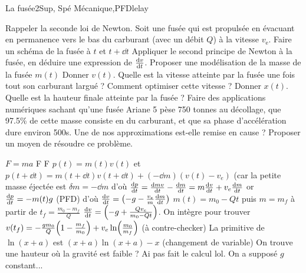 \begin{exercise}{La fusée}{2}{Sup, Spé}
{Mécanique,PFD}{lelay}

\begin{questions}
    \questioncours Rappeler la seconde loi de Newton.
    \question Soit une fusée qui est propulsée en évacuant en permanence vers le bas du carburant (avec un débit $Q$)  à la vitesse $v_\text{e}$. Faire un schéma de la fusée à $t$ et $t+\dd{t}$
    \question Appliquer le second principe de Newton à la fusée, en déduire une expression de $\dv{v}{t}$.
    \question Proposer une modélisation de la masse de la fusée $m(t)$
    \question Donner $v(t)$. Quelle est la vitesse atteinte par la fusée une fois tout son carburant largué ? Comment optimiser cette vitesse ?
    \question Donner $x(t)$. Quelle est la hauteur finale atteinte par la fusée ?
    \question Faire des applications numériques sachant qu'une fusée Ariane 5 pèse 750 tonnes au décollage, que 97.5\% de cette masse consiste en du carburant, et que sa phase d'accélération dure environ 500s.
    \question Une de nos approximations est-elle remise en cause ? Proposer un moyen de résoudre ce problème.
\end{questions}
\end{exercise}

\begin{solution}


\begin{questions}
    \questioncours $F=ma$
    \question F F 
    \question $p(t) = m(t) v(t)$ et $p(t+\dd{t}) = m(t+\dd{t})v(t+\dd{t}) + (-\dd{m})(v(t)-v_e)$ (car la petite masse éjectée est $\delta m = - \dd{m}$ d'où $\dv{p}{t} = \dv{mv}{t} - \dv{m}{t}(v-v_e) = m\dv{v}{t} + v_e\dv{m}{t}$ or $\dv{p}{t} = -m(t)g$ (PFD) d'où $\dv{v}{t} = \qty( - g - \frac{v_e}{m}\dv{m}{t})$
    \question $m(t) = m_0 - Qt$ puis $m = m_f$ à partir de $t_f = \frac{m_0-m_f}{Q}$
    \question $\dv{v}{t} = \qty( -g + \frac{Qv_e}{m_0 - Qt})$. On intègre pour trouver $v(t_f) = -\frac{g m_0}{Q}\qty(1-\frac{m_f}{m_0}) + v_e\ln(\frac{m_0}{m_f})$ (à contre-checker)
    \question La primitive de $\ln(x+a)$ est $(x+a)\ln(x+a) - x$ (changement de variable)
    \question On trouve une hauteur où la gravité est faible ? Ai pas fait le calcul lol.
    \question On a supposé $g$ constant...
\end{questions}

\end{solution}